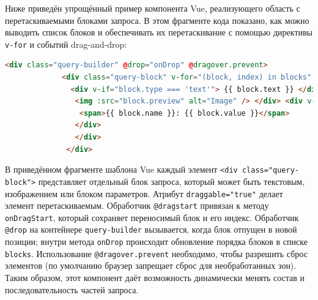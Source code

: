 Ниже приведён упрощённый пример компонента Vue, реализующего область с перетаскиваемыми блоками запроса. В этом фрагменте кода показано, как можно выводить список блоков и обеспечивать их перетаскивание с помощью директивы \verb|v-for| и событий drag-and-drop:
\newpage
\begin{lstlisting}[language=HTML]
       <div class="query-builder" @drop="onDrop" @dragover.prevent>
             <div class="query-block" v-for="(block, index) in blocks" :key="block.id" draggable="true" @dragstart="onDragStart(block, index)">
               <div v-if="block.type === 'text'"> {{ block.text }} </div> <div v-else-if="block.type === 'image'">
                <img :src="block.preview" alt="Image" /> </div> <div v-else-if="block.type === 'param'">
                 <span>{{ block.name }}: {{ block.value }}</span>
                </div>
                </div>
              </div>
\end{lstlisting}

\vspace{-0.5\baselineskip} 
В приведённом фрагменте шаблона Vue каждый элемент \verb|<div class="query-block">| представляет отдельный блок запроса, который может быть текстовым, изображением или блоком параметров. Атрибут \verb|draggable="true"| делает элемент перетаскиваемым. Обработчик \verb|@dragstart| привязан к методу \verb|onDragStart|, который сохраняет переносимый блок и его индекс. Обработчик \verb|@drop| на контейнере \verb|query-builder| вызывается, когда блок отпущен в новой позиции; внутри метода \verb|onDrop| происходит обновление порядка блоков в списке \verb|blocks|. Использование \verb|@dragover.prevent| необходимо, чтобы разрешить сброс элементов (по умолчанию браузер запрещает сброс для необработанных зон). Таким образом, этот компонент даёт возможность динамически менять состав и последовательность частей запроса.

